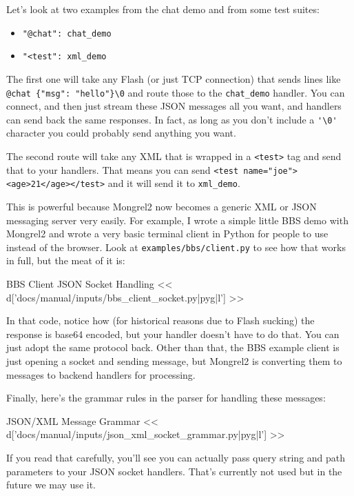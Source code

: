 Let's look at two examples from the chat demo and from some test suites:

\begin{itemize}
\item \verb|"@chat": chat_demo|
\item \verb|"<test": xml_demo|
\end{itemize}

The first one will take any Flash (or just TCP connection) that sends lines like
\verb|@chat {"msg": "hello"}\0| and route those to the \verb|chat_demo| handler.
You can connect, and then just stream these JSON messages all you want, and handlers
can send back the same responses.  In fact, as long as you don't include a \verb|'\0'|
character you could probably send anything you want.

The second route will take any XML that is wrapped in a \verb|<test>| tag and send
that to your handlers.  That means you can send \verb|<test name="joe"><age>21</age></test>|
and it will send it to \verb|xml_demo|.

This is powerful because Mongrel2 now becomes a generic XML or JSON messaging
server very easily.  For example, I wrote a simple little BBS demo with Mongrel2
and wrote a very basic terminal client in Python for people to use instead
of the browser.  Look at \verb|examples/bbs/client.py| to see how that works in
full, but the meat of it is:

\begin{code}{BBS Client JSON Socket Handling}
<< d['docs/manual/inputs/bbs_client_socket.py|pyg|l'] >>
\end{code}

In that code, notice how (for historical reasons due to Flash sucking) the
response is base64 encoded, but your handler doesn't have to do that.  You can
just adopt the same protocol back.  Other than that, the BBS example client
is just opening a socket and sending message, but Mongrel2 is converting them
to messages to backend handlers for processing.

Finally, here's the grammar rules in the parser for handling these messages:

\begin{code}{JSON/XML Message Grammar}
<< d['docs/manual/inputs/json_xml_socket_grammar.py|pyg|l'] >>
\end{code}

If you read that carefully, you'll see you can actually pass query string
and path parameters to your JSON socket handlers.  That's currently not
used but in the future we may use it.

